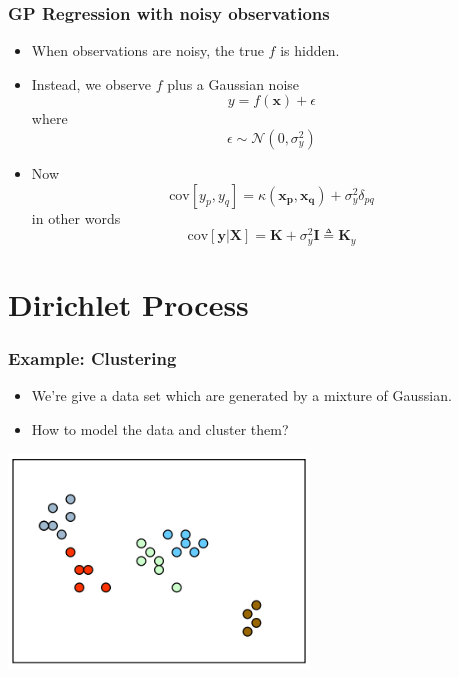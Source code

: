 \documentclass{beamer}
\begin{document}
\begin{frame}
	\frametitle{GP Regression with noisy observations}
	\begin{itemize}
		\item When observations are noisy, the true $f$ is hidden.
		\item Instead, we observe $f$ plus a Gaussian noise 
			\[
				y=f(\bm{x})+\epsilon
			\]
			where\[
			\epsilon \sim \mathcal{N}(0, \sigma_y^2)
			\]
		\item Now \[
		\text{cov}[y_p, y_q] = \kappa(\bm{x_p, x_q})+\sigma_y^2\delta_{pq}
		\] in other words
		\[
		\text{cov}[\bm{y|X}] = \bm{K}+\sigma_y^2 \bm{I} \triangleq \bm{K}_y
		\]
	\end{itemize}
\end{frame}
\section{Dirichlet Process}
\begin{frame}
	\frametitle{Example: Clustering}
	\begin{itemize}
		\item We're give a data set which are generated by a mixture of Gaussian.
		\item How to model the data and cluster them?
	\end{itemize}
	\centering
	\includegraphics[width=0.6\textwidth]{img/motive.png}
\end{frame}
\end{document}
